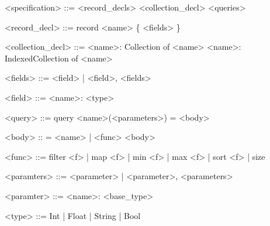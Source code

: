 \documentclass[14pt]{matmex-diploma}
\begin{document}


\begin{grammar}
<specification> ::= <record_decls> <collection_decl> <queries>
\end{grammar}

\begin{grammar}
<record_decl> ::= record <name> \{ <fields> \}
\end{grammar}

\begin{grammar}
<collection_decl> ::= <name>: Collection of <name>
\alt <name>: IndexedCollection of <name>
\end{grammar}

\begin{grammar}
<fields> ::= <field> | <field>, <fields>
\end{grammar}

\begin{grammar}
<field> ::= <name>: <type>
\end{grammar}

\begin{grammar}
<query> ::= query <name>(<parameters>) = <body>
\end{grammar}

\begin{grammar}
<body> :: = <name> | <func> <body>
\end{grammar}

\begin{grammar}
<func> ::= filter <f> | map <f> | min <f> | max <f> | sort <f> | size
\end{grammar}

\begin{grammar}
<paramters> ::= <parameter> | <parameter>, <parameters>
\end{grammar}

\begin{grammar}
<paramter> ::= <name>: <base_type>
\end{grammar}

\begin{grammar}
<type> ::= Int | Float | String | Bool
\end{grammar}
\end{document}
